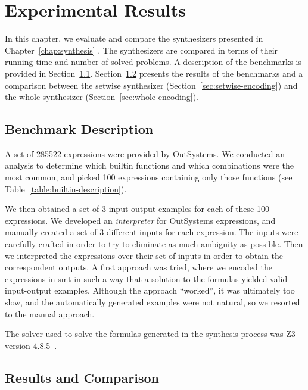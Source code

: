 \chapter{Experimental Results}
\label{chap:experimental-results}

In this chapter, we evaluate and compare the synthesizers presented in
Chapter~\ref{chap:synthesis} .
The synthesizers are compared in terms of their running time and number of
solved problems.
A description of the benchmarks is provided in Section~\ref{sec:bench-desc}.
Section~\ref{sec:results-and-comparison} presents the results of the benchmarks
and a comparison between the setwise synthesizer
(Section~\ref{sec:setwise-encoding}) and the whole synthesizer
(Section~\ref{sec:whole-encoding}).

\section{Benchmark Description}
\label{sec:bench-desc}

A set of 285522 expressions were provided by OutSystems.
We conducted an analysis to determine which builtin functions and which
combinations were the most common, and picked 100 expressions containing only
those functions (see Table~\ref{table:builtin-description}).

We then obtained a set of 3 input-output examples for each of these 100
expressions.
We developed an \textit{interpreter} for OutSystems expressions, and manually
created a set of 3 different inputs for each expression.
The inputs were carefully crafted in order to try to eliminate as much ambiguity
as possible.
Then we interpreted the expressions over their set of inputs in order to
obtain the correspondent outputs.
A first approach was tried, where we encoded the expressions in \gls{smt} in
such a way that a solution to the formulas yielded valid input-output examples.
Although the approach ``worked'', it was ultimately too slow, and the
automatically generated examples were not natural, so we resorted to the manual
approach.

The solver used to solve the formulas generated in the synthesis process was Z3
version 4.8.5~\cite{DeMoura:2008:ZES}.



\section{Results and Comparison}
\label{sec:results-and-comparison}



